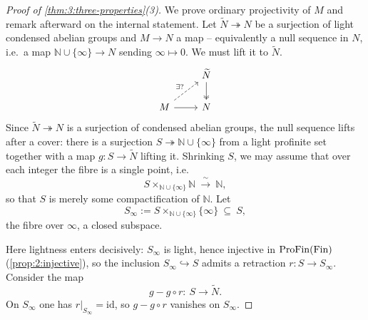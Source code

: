 \begin{proof}[Proof of \cref{thm:3:three-properties}(3)]
We prove ordinary projectivity of $M$ and remark afterward on the internal
statement. Let $\widetilde{N}\twoheadrightarrow N$ be a surjection of light
condensed abelian groups and $M\to N$ a map -- equivalently a null sequence in
$N$, i.e.\ a map $\mathbb{N}\cup\{\infty\}\to N$ sending $\infty\mapsto 0$. We
must lift it to $\widetilde{N}$.
\[
\begin{tikzcd}
& \widetilde{N} \arrow[d, two heads] \\
M \arrow[r] \arrow[ur, dashed, "\exists?"] & N
\end{tikzcd}
\]
Since $\widetilde{N}\twoheadrightarrow N$ is a surjection of condensed abelian
groups, the null sequence lifts after a cover: there is a surjection
$S\twoheadrightarrow\mathbb{N}\cup\{\infty\}$ from a light profinite set together
with a map $g\colon S\to\widetilde{N}$ lifting it. Shrinking $S$, we may assume
that over each integer the fibre is a single point, i.e.
\begin{equation*}
S\times_{\mathbb{N}\cup\{\infty\}}\mathbb{N}\ \xrightarrow{\ \sim\ }\ \mathbb{N},
\end{equation*}
so that $S$ is merely some compactification of $\mathbb{N}$. Let
\begin{equation*}
S_\infty:=S\times_{\mathbb{N}\cup\{\infty\}}\{\infty\}\ \subseteq\ S,
\end{equation*}
the fibre over $\infty$, a closed subspace.

Here lightness enters decisively: $S_\infty$ is light, hence injective in
$\mathrm{ProFin}(\mathrm{Fin})$ (\cref{prop:2:injective}), so the inclusion
$S_\infty\hookrightarrow S$ admits a retraction $r\colon S\to S_\infty$. Consider
the map
\begin{equation*}
g-g\circ r\colon\ S\longrightarrow \widetilde{N}.
\end{equation*}
On $S_\infty$ one has $r|_{S_\infty}=\mathrm{id}$, so $g-g\circ r$ vanishes on
$S_\infty$.


\end{proof}
